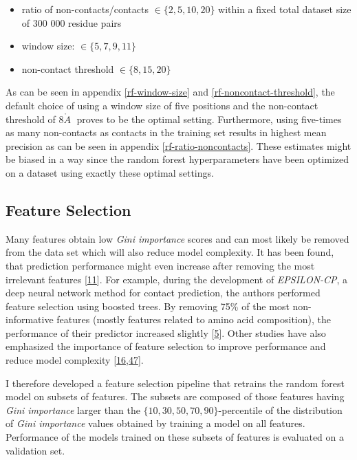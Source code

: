 \documentclass[12pt,a4paper,twoside]{book}
\providecommand{\tightlist}{%
  \setlength{\itemsep}{0pt}\setlength{\parskip}{0pt}}
\newcommand{\angstrom}{\mathring{A} \;}
\theoremstyle{definition}
\theoremstyle{definition}
\theoremstyle{remark}
\begin{document}
\begin{itemize}
\tightlist
\item
  ratio of non-contacts/contacts \(\in \{2, 5, 10, 20 \}\) within a
  fixed total dataset size of 300 000 residue pairs
\item
  window size: \(\in \{5, 7, 9, 11\}\)
\item
  non-contact threshold \(\in \{8, 15, 20\}\)
\end{itemize}

As can be seen in appendix \ref{rf-window-size} and
\ref{rf-noncontact-threshold}, the default choice of using a window size
of five positions and the non-contact threshold of \(8 \angstrom\)
proves to be the optimal setting. Furthermore, using five-times as many
non-contacts as contacts in the training set results in highest mean
precision as can be seen in appendix \ref{rf-ratio-noncontacts}. These
estimates might be biased in a way since the random forest
hyperparameters have been optimized on a dataset using exactly these
optimal settings.

\subsection{Feature Selection}\label{rf-feature-selection}

Many features obtain low \emph{Gini importance} scores and can most
likely be removed from the data set which will also reduce model
complexity. It has been found, that prediction performance might even
increase after removing the most irrelevant features
{[}\protect\hyperlink{ref-Menze2009}{11}{]}. For example, during the
development of \emph{EPSILON-CP}, a deep neural network method for
contact prediction, the authors performed feature selection using
boosted trees. By removing 75\% of the most non-informative features
(mostly features related to amino acid composition), the performance of
their predictor increased slightly
{[}\protect\hyperlink{ref-Stahl2017}{5}{]}. Other studies have also
emphasized the importance of feature selection to improve performance
and reduce model complexity
{[}\protect\hyperlink{ref-Li2011}{16},\protect\hyperlink{ref-Cheng2007}{47}{]}.

I therefore developed a feature selection pipeline that retrains the
random forest model on subsets of features. The subsets are composed of
those features having \emph{Gini importance} larger than the
\(\{10, 30, 50, 70, 90\}\)-percentile of the distribution of \emph{Gini
importance} values obtained by training a model on all features.
Performance of the models trained on these subsets of features is
evaluated on a validation set.
\end{document}
